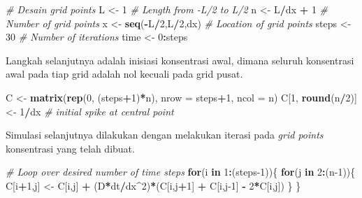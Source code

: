 \documentclass[]{book}
\newenvironment{Shaded}{\begin{snugshade}}{\end{snugshade}}
\newcommand{\CommentTok}[1]{\textcolor[rgb]{0.56,0.35,0.01}{\textit{#1}}}
\newcommand{\ControlFlowTok}[1]{\textcolor[rgb]{0.13,0.29,0.53}{\textbf{#1}}}
\newcommand{\DataTypeTok}[1]{\textcolor[rgb]{0.13,0.29,0.53}{#1}}
\newcommand{\DecValTok}[1]{\textcolor[rgb]{0.00,0.00,0.81}{#1}}
\newcommand{\KeywordTok}[1]{\textcolor[rgb]{0.13,0.29,0.53}{\textbf{#1}}}
\newcommand{\NormalTok}[1]{#1}
\newcommand{\OperatorTok}[1]{\textcolor[rgb]{0.81,0.36,0.00}{\textbf{#1}}}
\newcommand{\StringTok}[1]{\textcolor[rgb]{0.31,0.60,0.02}{#1}}
\theoremstyle{definition}
\theoremstyle{definition}
\theoremstyle{definition}
\theoremstyle{remark}
\begin{document}
\begin{Shaded}
\begin{Highlighting}[]
\CommentTok{# Desain grid points}
\NormalTok{L     <-}\StringTok{ }\DecValTok{1}                \CommentTok{# Length from -L/2 to L/2}
\NormalTok{n     <-}\StringTok{ }\NormalTok{L}\OperatorTok{/}\NormalTok{dx }\OperatorTok{+}\StringTok{ }\DecValTok{1}         \CommentTok{# Number of grid points}
\NormalTok{x     <-}\StringTok{ }\KeywordTok{seq}\NormalTok{(}\OperatorTok{-}\NormalTok{L}\OperatorTok{/}\DecValTok{2}\NormalTok{,L}\OperatorTok{/}\DecValTok{2}\NormalTok{,dx) }\CommentTok{# Location of grid points}
\NormalTok{steps <-}\StringTok{ }\DecValTok{30}               \CommentTok{# Number of iterations}
\NormalTok{time  <-}\StringTok{ }\DecValTok{0}\OperatorTok{:}\NormalTok{steps}
\end{Highlighting}
\end{Shaded}

Langkah selanjutnya adalah inisiasi konsentrasi awal, dimana seluruh konsentrasi awal pada tiap grid adalah nol kecuali pada grid pusat.

\begin{Shaded}
\begin{Highlighting}[]
\NormalTok{C <-}\StringTok{ }\KeywordTok{matrix}\NormalTok{(}\KeywordTok{rep}\NormalTok{(}\DecValTok{0}\NormalTok{, (steps}\OperatorTok{+}\DecValTok{1}\NormalTok{)}\OperatorTok{*}\NormalTok{n), }\DataTypeTok{nrow =}\NormalTok{ steps}\OperatorTok{+}\DecValTok{1}\NormalTok{, }\DataTypeTok{ncol =}\NormalTok{ n)}
\NormalTok{C[}\DecValTok{1}\NormalTok{, }\KeywordTok{round}\NormalTok{(n}\OperatorTok{/}\DecValTok{2}\NormalTok{)] <-}\StringTok{ }\DecValTok{1}\OperatorTok{/}\NormalTok{dx  }\CommentTok{# initial spike at central point}
\end{Highlighting}
\end{Shaded}

Simulasi selanjutnya dilakukan dengan melakukan iterasi pada \emph{grid points} konsentrasi yang telah dibuat.

\begin{Shaded}
\begin{Highlighting}[]
\CommentTok{# Loop over desired number of time steps}
\ControlFlowTok{for}\NormalTok{(i }\ControlFlowTok{in} \DecValTok{1}\OperatorTok{:}\NormalTok{(steps}\DecValTok{-1}\NormalTok{))\{}
  \ControlFlowTok{for}\NormalTok{(j }\ControlFlowTok{in} \DecValTok{2}\OperatorTok{:}\NormalTok{(n}\DecValTok{-1}\NormalTok{))\{}
\NormalTok{    C[i}\OperatorTok{+}\DecValTok{1}\NormalTok{,j] <-}\StringTok{ }\NormalTok{C[i,j] }\OperatorTok{+}\StringTok{ }\NormalTok{(D}\OperatorTok{*}\NormalTok{dt}\OperatorTok{/}\NormalTok{dx}\OperatorTok{^}\DecValTok{2}\NormalTok{)}\OperatorTok{*}\NormalTok{(C[i,j}\OperatorTok{+}\DecValTok{1}\NormalTok{] }\OperatorTok{+}\StringTok{ }\NormalTok{C[i,j}\DecValTok{-1}\NormalTok{] }\OperatorTok{-}\StringTok{ }\DecValTok{2}\OperatorTok{*}\NormalTok{C[i,j])}
\NormalTok{  \}}
\NormalTok{\}}
\end{Highlighting}
\end{Shaded}
\end{document}
